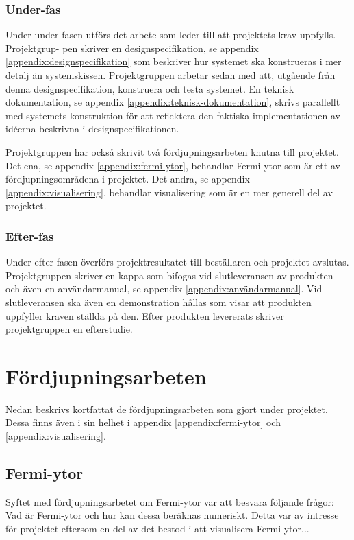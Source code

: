 \documentclass[a4paper,12pt]{article}
\begin{document}
\subsubsection{Under-fas}
Under  under-fasen  utförs  det  arbete  som  leder  till  att  projektets  krav  uppfylls.  Projektgrup-
pen skriver en designspecifikation, se appendix \ref{appendix:designspecifikation}
som beskriver hur systemet ska konstrueras i mer detalj än
systemskissen. Projektgruppen arbetar sedan med att, utgående från denna designspecifikation, konstruera och testa systemet. En teknisk dokumentation, se appendix \ref{appendix:teknisk-dokumentation}, skrivs parallellt med systemets konstruktion för att reflektera den faktiska implementationen av idéerna beskrivna i designspecifikationen. 

Projektgruppen har också skrivit två fördjupningsarbeten knutna till projektet. Det ena, se appendix \ref{appendix:fermi-ytor}, behandlar Fermi-ytor som är ett av fördjupningsområdena i projektet. Det andra, se appendix \ref{appendix:visualisering}, behandlar visualisering som är en mer generell del av projektet. 

\subsubsection{Efter-fas}
Under efter-fasen överförs projektresultatet till beställaren och projektet avslutas. Projektgruppen skriver en kappa som bifogas vid slutleveransen av produkten och även en användarmanual, se appendix \ref{appendix:användarmanual}. Vid slutleveransen ska
även en demonstration hållas som visar att produkten uppfyller kraven ställda på den. Efter produkten levererats skriver projektgruppen en efterstudie.

\section{Fördjupningsarbeten}
\label{ch:fordjupningsarbeten}
Nedan beskrivs kortfattat de fördjupningsarbeten som gjort under projektet. Dessa finns även i sin helhet i appendix \ref{appendix:fermi-ytor} och \ref{appendix:visualisering}. 
\subsection{Fermi-ytor}
Syftet med fördjupningsarbetet om Fermi-ytor var att besvara följande frågor: Vad är Fermi-ytor och hur kan dessa beräknas numeriskt. Detta var av intresse för projektet eftersom en del av det bestod i att visualisera Fermi-ytor...
\end{document}

